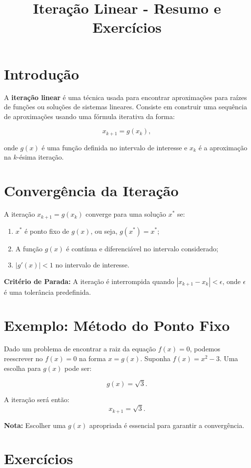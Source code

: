 \documentclass[a4paper,11pt]{article}
\title{Iteração Linear - Resumo e Exercícios}
\author{}
\date{}
\begin{document}
\maketitle

\section*{Introdução}
A \textbf{iteração linear} é uma técnica usada para encontrar aproximações para raízes de funções ou soluções de sistemas lineares. Consiste em construir uma sequência de aproximações usando uma fórmula iterativa da forma:

\[
x_{k+1} = g(x_k),
\]

onde $g(x)$ é uma função definida no intervalo de interesse e $x_k$ é a aproximação na $k$-ésima iteração.

\section*{Convergência da Iteração}
A iteração $x_{k+1} = g(x_k)$ converge para uma solução $x^*$ se:
\begin{enumerate}
    \item $x^*$ é ponto fixo de $g(x)$, ou seja, $g(x^*) = x^*$;
    \item A função $g(x)$ é contínua e diferenciável no intervalo considerado;
    \item $|g'(x)| < 1$ no intervalo de interesse.
\end{enumerate}

\textbf{Critério de Parada:} A iteração é interrompida quando $|x_{k+1} - x_k| < \epsilon$, onde $\epsilon$ é uma tolerância predefinida.

\section*{Exemplo: Método do Ponto Fixo}
Dado um problema de encontrar a raiz da equação $f(x) = 0$, podemos reescrever no $f(x) = 0$ na forma $x = g(x)$. Suponha $f(x) = x^2 - 3$. Uma escolha para $g(x)$ pode ser:

\[
g(x) = \sqrt{3}.
\]

A iteração será então:
\[
x_{k+1} = \sqrt{3}.
\]

\textbf{Nota:} Escolher uma $g(x)$ apropriada é essencial para garantir a convergência.

\section*{Exercícios}
\end{document}
